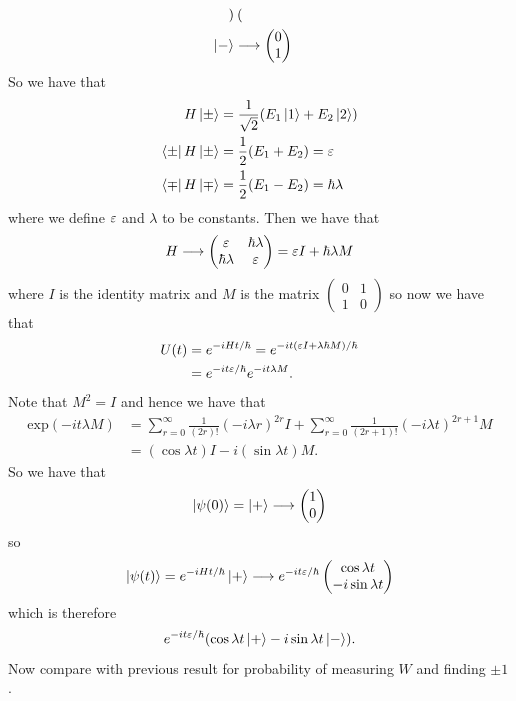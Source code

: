 \documentclass{article}
\begin{document}
\begin{example}
\begin{align*}
\begin{pmatrix}
	  \end{pmatrix} \\
		  \ket - &\longrightarrow \begin{pmatrix}
		    0 \\ 1
		  \end{pmatrix}
  \end{align*}
  So we have that
  \begin{align*}
	  H \ket \pm &= \frac 1{\sqrt 2}(E_1\ket 1 + E_2\ket 2)\\
	  \bra \pm H\ket \pm &= \frac 12(E_1+E_2) = \varepsilon \\
	  \bra \mp H \ket \mp &= \frac 12(E_1-E_2) = \hbar\lambda
  \end{align*}
  where we define $ \varepsilon $ and $ \lambda $ to be constants. Then we have that
  \[
    H\longrightarrow \begin{pmatrix}
	    \varepsilon & \hbar \lambda \\
	    \hbar\lambda & \varepsilon
    \end{pmatrix} = \varepsilon I + \hbar\lambda M
  \]
  where $ I $ is the identity matrix and $ M $ is the matrix $ \begin{pmatrix}
     0 & 1 \\ 1 & 0
  \end{pmatrix} $ so now we have that
  \begin{align*}
	  U(t) &= e^{-iHt/\hbar} = e^{-it(\varepsilon I + \lambda\hbar M)/\hbar} \\
	       &= e^{-i t \varepsilon/\hbar}e^{-it\lambda M}.
  \end{align*}
  Note that $ M^2 = I $ and hence we have that
  \begin{align*}
	  \mathrm{exp}(-it\lambda M)& = \sum_{r=0}^\infty \frac 1{(2r)!} (-i\lambda r)^{2r} I + \sum_{r=0}^\infty \frac 1{(2r+1)!}(-i\lambda t)^{2r+1} M \\
				    &= (\cos\lambda t) I -i (\sin\lambda t) M.
  \end{align*}
  So we have that 
  \begin{align*}
	  \ket{\psi(0)} = \ket + \longrightarrow \begin{pmatrix}
	    1 \\ 0
	  \end{pmatrix}
  \end{align*}
  so
  \[
	  \ket{\psi(t)} = e^{-iHt/\hbar} \ket +\longrightarrow e^{-it\varepsilon/\hbar}\begin{pmatrix}
	    \cos\lambda t \\
	    -i\sin\lambda t
	  \end{pmatrix}
  \]
  which is therefore 
  \[
	  e^{-it\varepsilon/\hbar}(\cos\lambda t \ket + - i\sin\lambda t\ket -).
  \]
  Now compare with previous result for probability of measuring $ W $ and finding $ \pm 1 $.
\end{example}
\end{document}
